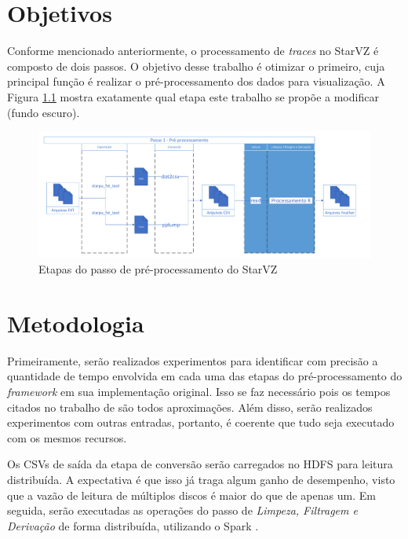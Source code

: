 \documentclass[prop-esp]{iiufrgs}
\begin{document}
%
\chapter{Objetivos} \label{lbl:objetivos}

Conforme mencionado anteriormente, o processamento de \emph{traces} no StarVZ é composto de dois passos. O objetivo desse trabalho é otimizar o primeiro, cuja principal função é realizar o pré-processamento dos dados para visualização. A Figura \ref{fig:starvz-preproc} mostra exatamente qual etapa este trabalho se propõe a modificar (fundo escuro).

\begin{figure}[H]
 \centerline{\includegraphics[width=1\textwidth]{./images/step1-simpler.pdf}}
 \caption{Etapas do passo de pré-processamento do StarVZ}
 \label{fig:starvz-preproc}
\end{figure}


%
\chapter{Metodologia} \label{lbl:metodologia}

Primeiramente, serão realizados experimentos para identificar com precisão a quantidade de tempo
envolvida em cada uma das etapas do pré-processamento do \emph{framework} em sua implementação original. Isso se faz necessário
pois os tempos citados no trabalho de \citet{ref:starvz} são todos aproximações. Além disso, serão realizados experimentos com 
outras entradas, portanto, é coerente que tudo seja executado com os mesmos recursos.

Os CSVs de saída da etapa de conversão serão carregados no HDFS \cite{ref:hdfs} para leitura distribuída. A expectativa é que isso já traga algum ganho de desempenho, visto que a vazão de leitura de múltiplos discos é maior do que de apenas um. Em seguida, serão executadas as operações do passo de \emph{Limpeza, Filtragem e Derivação} de forma distribuída, utilizando o Spark \cite{ref:spark}.
\end{document}
